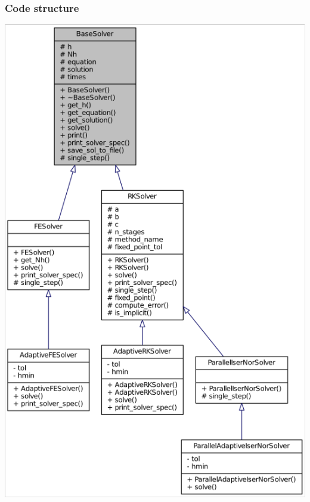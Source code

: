\documentclass{beamer}
\begin{document}
\begin{frame} %
	\frametitle{Code structure}
	\begin{center}
		\includegraphics[scale=0.25]{etc/classes_full.png}
	\end{center}
\end{frame}
\end{document}

